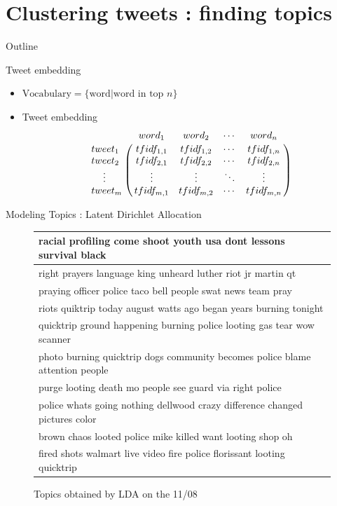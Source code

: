 \documentclass[first=dblue,second=red,logo=blueexc]{aaltoslides}
\begin{document}

\section{Clustering tweets : finding topics}
\begin{frame}{Outline}
\tableofcontents[sectionstyle=show/shaded]
\end{frame}

\begin{frame}{Tweet embedding}
\begin{itemize}
\item $\text{Vocabulary} = \{\text{word} | \text{word in top $n$} \}$
\item Tweet embedding \\
\[
\bordermatrix{
~ & word_1 & word_2 & \cdots & word_n \cr 
tweet_1 & tfidf_{1,1} & tfidf_{1,2} & \cdots & tfidf_{1,n} \cr
tweet_2 & tfidf_{2,1} & tfidf_{2,2} & \cdots & tfidf_{2,n} \cr
\hspace{12pt}\vdots & \vdots & \vdots & \ddots & \vdots \cr
tweet_m & tfidf_{m,1} & tfidf_{m,2} & \cdots & tfidf_{m,n} \cr
}
\]
\end{itemize}
\end{frame}


\begin{frame}{Modeling Topics : Latent Dirichlet Allocation}

{\footnotesize
\begin{figure}[H]
  \centering
\begin{tabular}{l}
\hline
racial profiling come shoot youth usa dont lessons survival black \\ \hline
right prayers language king unheard luther riot jr martin qt \\ \hline
praying officer police taco bell people swat news team pray \\ \hline
riots quiktrip today august watts ago began years burning tonight \\ \hline
quicktrip ground happening burning police looting gas tear wow scanner \\ \hline
photo burning quicktrip dogs community becomes police blame attention people \\ \hline
purge looting death mo people see guard via right police \\ \hline
police whats going nothing dellwood crazy difference changed pictures color \\ \hline
brown chaos looted police mike killed want looting shop oh \\ \hline
fired shots walmart live video fire police florissant looting quicktrip \\ \hline
\end{tabular}
\caption{Topics obtained by LDA on the 11/08}
\end{figure}
}

\end{frame}
\end{document}
